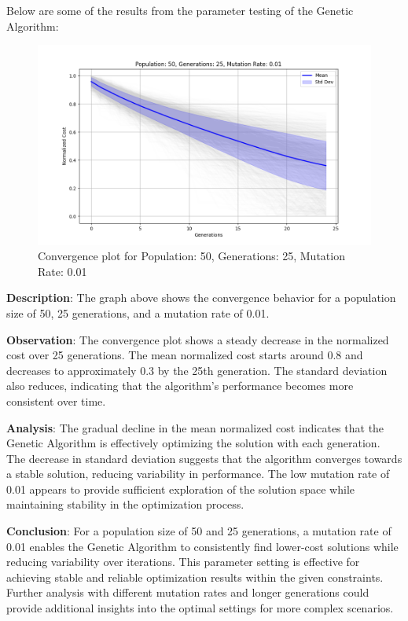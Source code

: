 \documentclass{article}
\begin{document}
    Below are some of the results from the parameter testing of the Genetic Algorithm:

    \begin{figure}[H]
        \centering
        \includegraphics[width=\textwidth]{genetic_algorithm/Population_50_Generations_25_MutationRate_0.01}
        \caption{Convergence plot for Population: 50, Generations: 25, Mutation Rate: 0.01}
        \label{fig:ga_50_25_01}
    \end{figure}

    \textbf{Description}: The graph above shows the convergence behavior for a population size of 50, 25 generations, and a mutation rate of 0.01.

    \textbf{Observation}: The convergence plot shows a steady decrease in the normalized cost over 25 generations. The mean normalized cost starts around 0.8 and decreases to approximately 0.3 by the 25th generation. The standard deviation also reduces, indicating that the algorithm's performance becomes more consistent over time.

    \textbf{Analysis}: The gradual decline in the mean normalized cost indicates that the Genetic Algorithm is effectively optimizing the solution with each generation. The decrease in standard deviation suggests that the algorithm converges towards a stable solution, reducing variability in performance. The low mutation rate of 0.01 appears to provide sufficient exploration of the solution space while maintaining stability in the optimization process.

    \textbf{Conclusion}: For a population size of 50 and 25 generations, a mutation rate of 0.01 enables the Genetic Algorithm to consistently find lower-cost solutions while reducing variability over iterations. This parameter setting is effective for achieving stable and reliable optimization results within the given constraints. Further analysis with different mutation rates and longer generations could provide additional insights into the optimal settings for more complex scenarios.
\end{document}
